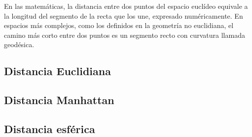 En las matemáticas, la distancia entre dos puntos del espacio euclídeo equivale a la longitud del segmento de la recta que los une, expresado numéricamente. En espacios más complejos, como los definidos en la geometría no euclidiana, el camino más corto entre dos puntos es un segmento recto con curvatura llamada geodésica. 

\subsection{Distancia Euclidiana}


\subsection{Distancia Manhattan}



\subsection{Distancia esférica}
